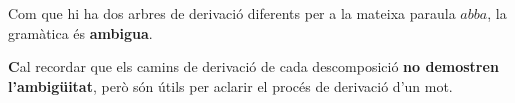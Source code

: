 \documentclass{article}
\begin{document}
\noindent Com que hi ha dos arbres de derivació diferents per a la mateixa paraula $abba$, la gramàtica és \textbf{ambigua}.

\vspace{1em}

\noindent \textcolor{OliveGreen}{\textbf Cal recordar que els camins de derivació de cada descomposició \textbf{no demostren l'ambigüitat}, però són útils per aclarir el procés de derivació d'un mot.}

\begin{comment}    

\noindent Els camins de derivació de cada descomposició són els següents \textbf{No demostren l'ambigüitat}, però són útils per aclarir el procés de derivació d'un mot:

\begin{align*}
S &\xRightarrow[S \to AaBA]{} AaBA \\
   &\xRightarrow[A \to aA]{} aBA \\
   &\xRightarrow[B \to bb]{} abbA \\
   &\xRightarrow[A \to \lambda]{} abba
\end{align*}

\begin{align*}
S &\xRightarrow[S \to ABaA]{} ABaA \\
   &\xRightarrow[A \to aA]{} aBaA \\
   &\xRightarrow[B \to bb]{} abbaA \\
   &\xRightarrow[A \to \lambda]{} abba
\end{align*}
\vspace{1em}
\end{comment}
\end{document}
